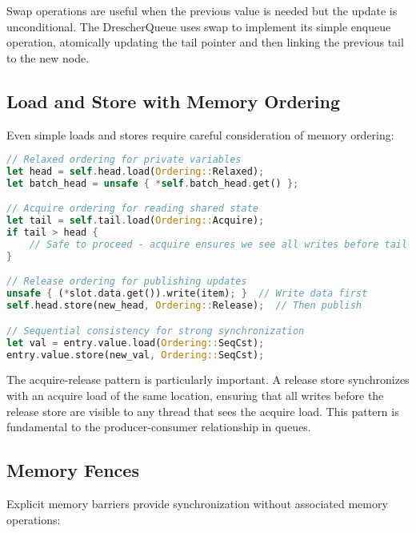 Swap operations are useful when the previous value is needed but the update is unconditional. The DrescherQueue uses swap to implement its simple enqueue operation, atomically updating the tail pointer and then linking the previous tail to the new node.

\subsection{Load and Store with Memory Ordering}

Even simple loads and stores require careful consideration of memory ordering:

\begin{lstlisting}[language=Rust, style=boxed, caption={Memory ordering for loads and stores}, label={lst:load-store}]
// Relaxed ordering for private variables
let head = self.head.load(Ordering::Relaxed);
let batch_head = unsafe { *self.batch_head.get() };

// Acquire ordering for reading shared state
let tail = self.tail.load(Ordering::Acquire);
if tail > head {
    // Safe to proceed - acquire ensures we see all writes before tail update
}

// Release ordering for publishing updates
unsafe { (*slot.data.get()).write(item); }  // Write data first
self.head.store(new_head, Ordering::Release);  // Then publish

// Sequential consistency for strong synchronization
let val = entry.value.load(Ordering::SeqCst);
entry.value.store(new_val, Ordering::SeqCst);
\end{lstlisting}

The acquire-release pattern is particularly important. A release store synchronizes with an acquire load of the same location, ensuring that all writes before the release store are visible to any thread that sees the acquire load. This pattern is fundamental to the producer-consumer relationship in queues.

\subsection{Memory Fences}

Explicit memory barriers provide synchronization without associated memory operations:

